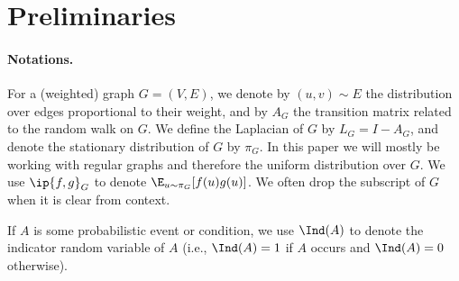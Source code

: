 \section{Preliminaries}\label{sec:prelims-sos} 

\paragraph{Notations.} 
For a (weighted) graph $G=(V,E)$, we denote by $(u,v) \sim E$ the distribution over edges proportional to their weight, and by $A_G$ the transition matrix related to the random walk on $G$.
We define the Laplacian of $G$ by $L_G = I - A_G$, and denote the stationary distribution of $G$ by $\pi_G$. In this paper we will mostly be working with regular graphs and therefore the uniform distribution over $G$. We use $\ip{f,g}_G$ to denote $\E_{u \sim \pi_G}[f(u)g(u)]$. We often drop the subscript of $G$ when it is clear from context. 

If $A$ is some probabilistic event or condition, we use $\Ind(A)$ to denote the indicator random variable of $A$ (i.e., $\Ind(A)=1$ if $A$ occurs and $\Ind(A)=0$ otherwise). 





